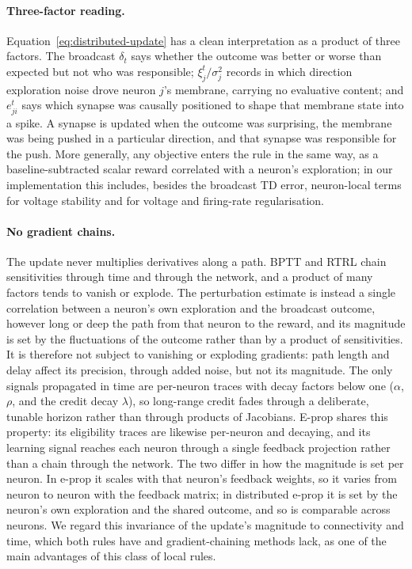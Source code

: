 \documentclass[10pt,twocolumn]{article}
\begin{document}
\paragraph{Three-factor reading.}
Equation~\eqref{eq:distributed-update} has a clean interpretation as a product
of three factors. The broadcast $\delta_t$ says whether the outcome was better
or worse than expected but not who was responsible; $\xi^t_j/\sigma_j^2$ records
in which direction exploration noise drove neuron $j$'s membrane, carrying no
evaluative content; and $e^t_{ji}$ says which synapse was causally positioned
to shape that membrane state into a spike. A synapse is updated when the
outcome was surprising, the membrane was being pushed in a particular
direction, and that synapse was responsible for the push. More generally, any
objective enters the rule in the same way, as a baseline-subtracted scalar
reward correlated with a neuron's exploration; in our implementation this
includes, besides the broadcast TD error, neuron-local terms for voltage
stability and for voltage and firing-rate regularisation.

\paragraph{No gradient chains.}
The update never multiplies derivatives along a path. BPTT and RTRL chain
sensitivities through time and through the network, and a product of many
factors tends to vanish or explode. The perturbation estimate is instead a
single correlation between a neuron's own exploration and the broadcast
outcome, however long or deep the path from that neuron to the reward, and its
magnitude is set by the fluctuations of the outcome rather than by a product of
sensitivities. It is therefore not subject to vanishing or exploding gradients:
path length and delay affect its precision, through added noise, but not its
magnitude. The only signals propagated in time are per-neuron traces with decay
factors below one ($\alpha$, $\rho$, and the credit decay $\lambda$), so
long-range credit fades through a deliberate, tunable horizon rather than
through products of Jacobians. E-prop shares this property: its eligibility
traces are likewise per-neuron and decaying, and its learning signal reaches
each neuron through a single feedback projection rather than a chain through the
network. The two differ in how the magnitude is set per neuron. In e-prop it
scales with that neuron's feedback weights, so it varies from neuron to neuron
with the feedback matrix; in distributed e-prop it is set by the neuron's own
exploration and the shared outcome, and so is comparable across neurons. We
regard this invariance of the update's magnitude to connectivity and time, which
both rules have and gradient-chaining methods lack, as one of the main
advantages of this class of local rules.
\end{document}

